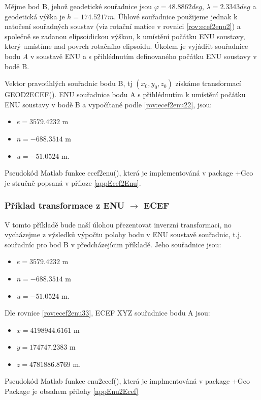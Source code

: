 \documentclass[11pt,a4paper]{article}
\begin{document}
Mějme bod B, jehož geodetické souřadnice jsou $ \varphi = 48.8862 deg$, $\lambda = 2.3343 deg$ a geodetická výška je $ h = 174.5217 m $. Úhlové souřadnice použijeme jednak k natočení souřadných soustav (viz rotační matice v rovnici \ref{rov:ecef2enu2}) a společně se zadanou elipsoidickou výškou, k umístění počátku ENU soustavy, který umístíme nad povrch rotačního elipsoidu. Úkolem je vyjádřit souřadnice bodu \textit{A} v soustavě ENU a s přihlédnutím definovaného počátku ENU soustavy v bodě B.

Vektor pravoúhlých souřadnic bodu B, tj $ \left(x_{0}, y_{0}, z_{0} \right)$ získáme transformací GEOD2ECEF(). ENU souřadnice bodu A s přihlédnutím k umístění počátku ENU soustavy v bodě B a vypočítané podle \ref{rov:ecef2enu22}, jsou:
\begin{itemize}
\item $e = 3579.4232 $ m
\item $n = -688.3514 $ m
\item $u = -51.0524 $ m.
\end{itemize}

Pseudokód Matlab funkce ecef2enu(), která je implementováná v package +Geo je stručně popsaná v příloze \ref{appEcef2Enu}.

\subsubsection{Příklad transformace z ENU $\rightarrow$ ECEF}

V tomto příkladě bude naší úlohou přezentovat inverzní transformaci, no vycházejme z výsledků výpočtu polohy bodu v ENU soustavě souřadnic, t.j. souřadníc pro bod B v předcházejícim příkladě. Jeho souřadnice jsou:

\begin{itemize}
\item $e = 3579.4232$ m
\item $n = -688.3514$ m
\item $u = -51.0524$ m.
\end{itemize}


Dle rovnice \ref{rov:ecef2enu33}, ECEF XYZ souřadnice bodu A jsou:
\begin{itemize}
\item $x = 4198944.6161$ m
\item $y = 174747.2383$ m
\item $z = 4781886.8769$ m.
\end{itemize}

Pseudokód Matlab funkce enu2ecef(), která je implmentováná v package +Geo Package je obsahem přílohy \ref{appEnu2Ecef}
\end{document}
